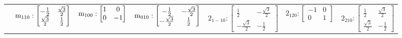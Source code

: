 \documentclass[fleqn,8pt,landscape]{jsarticle}
\begin{document}
\begin{longtable}{ccccccc}
& $ {\rm m}_{110}:\begin{bmatrix} - \frac{1}{2} & \frac{\sqrt{3}}{2} \\ \frac{\sqrt{3}}{2} & \frac{1}{2} \end{bmatrix} $ & $ {\rm m}_{100}:\begin{bmatrix} 1 & 0 \\ 0 & -1 \end{bmatrix} $ & $ {\rm m}_{010}:\begin{bmatrix} - \frac{1}{2} & - \frac{\sqrt{3}}{2} \\ - \frac{\sqrt{3}}{2} & \frac{1}{2} \end{bmatrix} $ & $ 2{}_{1-10}:\begin{bmatrix} \frac{1}{2} & - \frac{\sqrt{3}}{2} \\ - \frac{\sqrt{3}}{2} & - \frac{1}{2} \end{bmatrix} $ & $ 2{}_{120}:\begin{bmatrix} -1 & 0 \\ 0 & 1 \end{bmatrix} $ & $ 2{}_{210}:\begin{bmatrix} \frac{1}{2} & \frac{\sqrt{3}}{2} \\ \frac{\sqrt{3}}{2} & - \frac{1}{2} \end{bmatrix} $ \\
\end{longtable}
\end{document}
